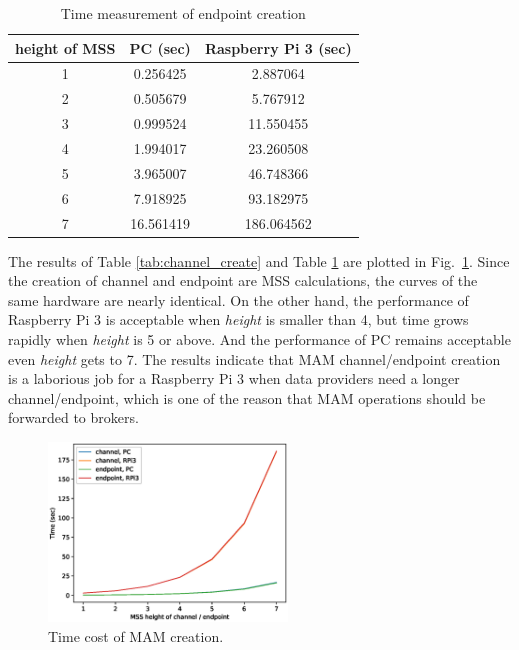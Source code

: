 \documentclass[conference]{IEEEtran}
\begin{document}
\begin{table}[htbp]
	\caption{Time measurement of endpoint creation}
	\label{tab:endpoint_create}
	\begin{center}
	\begin{tabular}{|c|c|c|}
	\hline
		\textbf{height of MSS} & \textbf{PC (sec)} & \textbf{Raspberry Pi 3 (sec)} \\ 
		\hline
		1 & 0.256425 & 2.887064 \\ 
		2 & 0.505679 & 5.767912 \\ 
		3 & 0.999524 & 11.550455 \\ 
		4 & 1.994017 & 23.260508 \\ 
		5 & 3.965007 & 46.748366 \\ 
		6 & 7.918925 & 93.182975 \\ 
		7 & 16.561419 & 186.064562 \\
		\hline
	\end{tabular}
	\end{center}
\end{table}

The results of Table \ref{tab:channel_create} and Table \ref{tab:endpoint_create} are plotted in Fig.~\ref{fig:mam_create}. Since the creation of channel and endpoint are MSS calculations, the curves of the same hardware are nearly identical. On the other hand, the performance of Raspberry Pi 3 is acceptable when \textit{height} is smaller than 4, but time grows rapidly when \textit{height} is 5 or above. And the performance of PC remains acceptable even \textit{height} gets to 7. The results indicate that MAM channel/endpoint creation is a laborious job for a Raspberry Pi 3 when data providers need a longer channel/endpoint, which is one of the reason that MAM operations should be forwarded to brokers.
  
\begin{figure}[!t]
    \centering
    \includegraphics[width=2.5in]{mam_create}
    \caption{Time cost of MAM creation.}
    \label{fig:mam_create}
\end{figure}
\end{document}
